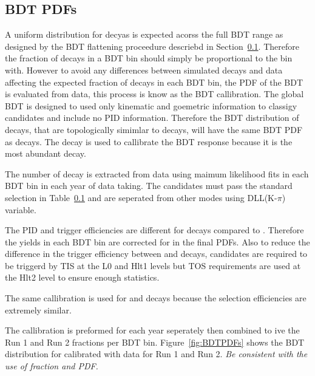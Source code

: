 \subsection{BDT PDFs}
A uniform distribution for \bmumu decyas is expected acorss the full BDT range as designed by the BDT flattening proceedure descriebd in Section~\ref{}. Therefore the fraction of \bmumu decays in a BDT bin should simply be proportional to the bin with. However to avoid any differences between simulated decays and data affecting the expected fraction of \bmumu decays in each BDT bin, the PDF of the BDT is evaluated from data, this process is know as the BDT callibration.
The global BDT is designed to used only kinematic and goemetric information to classigy candidates and include no PID information. Therefore the BDT distribution of \bhh decays, that are topologically simimlar to \bmumu decays, will have the same BDT PDF as \bmumu decays. The \bdkpi decay is used to callibrate the BDT response because it is the most abundant \bhh decay. 

The number of \bdkpi decay is extracted from data using maimum likelihood fits in each BDT bin in each year of data taking. The \bdkpi candidates must pass the standard \bhh selection in Table~\ref{} and are seperated from other \bhh modes using DLL(K-$\pi$) variable. 

The PID and trigger efficiencies are different for \bdkpi decays compared to \bmumu. Therefore the \bdkpi yields in each BDT bin are corrected for in the final PDFs. Also to reduce the difference in the trigger efficiency between \bdkip and \bmumu decays, \bdkpi candidates are required to be triggerd by TIS at the L0 and Hlt1 levels but TOS requirements are used at the Hlt2 level to ensure enough statistics.

The same callibration is used for \bsmumu and \bdmumu decays because the selection efficiencies are extremely similar. 

The callibration is preformed for each year seperately then combined to ive the Run 1 and Run 2 fractions per BDT bin. Figure~\ref{fig:BDTPDFs} shows the BDT distribution for \bsmumu calibrated with \bdkpi data for Run 1 and Run 2. 
{\it Be consistent with the use of fraction and PDF.}

